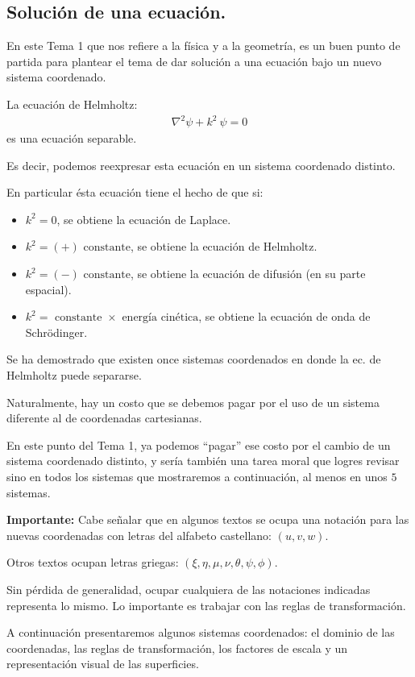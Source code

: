 \documentclass[12pt]{article}
\numberwithin{equation}{section}
\begin{document}
\subsection{Solución de una ecuación.}

En este Tema 1 que nos refiere a la física y a la geometría, es un buen punto de partida para plantear el tema de dar solución a una ecuación bajo un nuevo sistema coordenado.
\par
La ecuación de Helmholtz:
\begin{align}
\nabla^{2} \psi + k^{2} \: \psi = 0
\label{eq:ecuacion_02_01}
\end{align}
es una ecuación separable.
\par
Es decir, podemos reexpresar esta ecuación en un sistema coordenado distinto.
\par
En particular ésta ecuación tiene el hecho de que si:
\begin{itemize}
\item $k^{2} = 0$, se obtiene la ecuación de Laplace.
\item $k^{2} = (+) \mbox{ constante}$, se obtiene la ecuación de Helmholtz.
\item $k^{2} = (-) \mbox{ constante}$, se obtiene la ecuación de difusión (en su parte espacial).
\item $k^{2} = \mbox{ constante } \times \mbox{ energía cinética}$, se obtiene la ecuación de onda de Schrödinger.
\end{itemize}

Se ha demostrado que existen once sistemas coordenados en donde la ec. de Helmholtz puede separarse. 
\par
Naturalmente, hay un costo que se debemos pagar por el uso de un sistema diferente al de coordenadas cartesianas.
\par
En este punto del Tema 1, ya podemos \enquote{pagar} ese costo por el cambio de un sistema coordenado distinto, y sería también una tarea moral que logres revisar sino en todos los sistemas que mostraremos a continuación, al menos en unos $5$ sistemas.
\par
\textbf{Importante: } Cabe señalar que en algunos textos se ocupa una notación para las nuevas coordenadas con letras del alfabeto castellano: $(u,v,w)$.
\par
Otros textos ocupan letras griegas: $(\xi, \eta, \mu, \nu, \theta, \psi, \phi)$.
\par
Sin pérdida de generalidad, ocupar cualquiera de las notaciones indicadas representa lo mismo. Lo importante es trabajar con las reglas de transformación.
\par
A continuación presentaremos algunos sistemas coordenados: el dominio de las coordenadas, las reglas de transformación, los factores de escala y un representación visual de las superficies.
\end{document}
